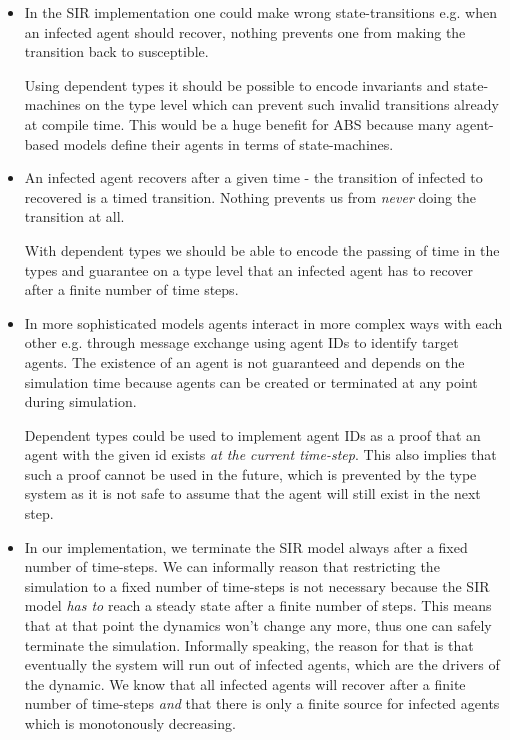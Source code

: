 \begin{itemize}

	\item In the SIR implementation one could make wrong state-transitions e.g. when an infected agent should recover, nothing prevents one from making the transition back to susceptible. 
	
	Using dependent types it should be possible to encode invariants and state-machines on the type level which can prevent such invalid transitions already at compile time. This would be a huge benefit for ABS because many agent-based models define their agents in terms of state-machines.
	
	\item An infected agent recovers after a given time - the transition of infected to recovered is a timed transition. Nothing prevents us from \textit{never} doing the transition at all. 
	
	With dependent types we should be able to encode the passing of time in the types and guarantee on a type level that an infected agent has to recover after a finite number of time steps.
	
	\item In more sophisticated models agents interact in more complex ways with each other e.g. through message exchange using agent IDs to identify target agents. The existence of an agent is not guaranteed and depends on the simulation time because agents can be created or terminated at any point during simulation. 
	
	Dependent types could be used to implement agent IDs as a proof that an agent with the given id exists \textit{at the current time-step}. This also implies that such a proof cannot be used in the future, which is prevented by the type system as it is not safe to assume that the agent will still exist in the next step.

	\item In our implementation, we terminate the SIR model always after a fixed number of time-steps. We can informally reason that restricting the simulation to a fixed number of time-steps is not necessary because the SIR model \textit{has to} reach a steady state after a finite number of steps. This means that at that point the dynamics won't change any more, thus one can safely terminate the simulation. Informally speaking, the reason for that is that eventually the system will run out of infected agents, which are the drivers of the dynamic. We know that all infected agents will recover after a finite number of time-steps \textit{and} that there is only a finite source for infected agents which is monotonously decreasing. 
	

\end{itemize}
